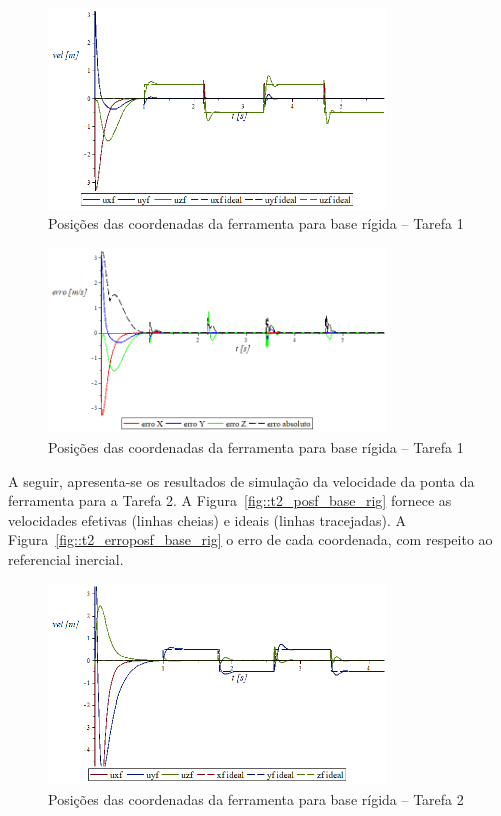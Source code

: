 \begin{figure}[h!]
	\centering 
 	\includegraphics[width=0.80\textwidth]{figs/t1_velf_base_rig}
 	\caption{Posições das coordenadas da ferramenta para base rígida -- Tarefa 1}
 	\label{fig::t1_velf_base_rig}
\end{figure}

\begin{figure}[h!]
	\centering 
 	\includegraphics[width=0.80\textwidth]{figs/t1_errovelf_base_rig}
 	\caption{Posições das coordenadas da ferramenta para base rígida -- Tarefa 1}
 	\label{fig::t1_errovelf_base_rig}
\end{figure}

A seguir, apresenta-se os resultados de simulação da velocidade da ponta da
ferramenta para a Tarefa 2.
A Figura~\ref{fig::t2_posf_base_rig} fornece as velocidades efetivas (linhas
cheias) e ideais (linhas tracejadas). A Figura~\ref{fig::t2_erroposf_base_rig} o
erro de cada coordenada, com respeito ao referencial inercial.

\begin{figure}[h!]
	\centering 
 	\includegraphics[width=0.80\textwidth]{figs/t2_velf_base_rig}
 	\caption{Posições das coordenadas da ferramenta para base rígida -- Tarefa 2}
 	\label{fig::t2_velf_base_rig}
\end{figure}

